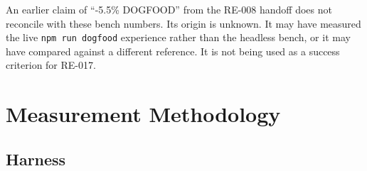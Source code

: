 An earlier claim of ``-5.5\% DOGFOOD'' from the RE-008 handoff does not reconcile with these bench numbers. Its origin is unknown. It may have measured the live \texttt{n\allowbreak{}p\allowbreak{}m\allowbreak{} \allowbreak{}r\allowbreak{}u\allowbreak{}n\allowbreak{} \allowbreak{}d\allowbreak{}o\allowbreak{}g\allowbreak{}f\allowbreak{}o\allowbreak{}o\allowbreak{}d} experience rather than the headless bench, or it may have compared against a different reference. It is not being used as a success criterion for RE-017.

\section{Measurement Methodology}\label{record-422-measurement-methodology}

\subsection{Harness}\label{record-422-harness}

